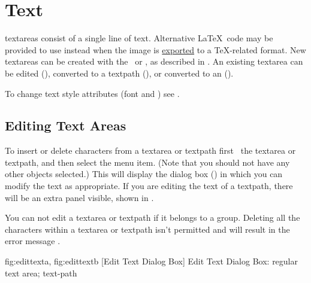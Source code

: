 
\chapter{Text}\label{sec:textareas}

\Glspl{textarea} consist of a single line of text. Alternative
\LaTeX\ code may be provided to use instead when the image
is \hyperref[sec:exportimage]{exported} to a \TeX-related format.
New \glspl{textarea} can be created with the
\texttool\ or \mathstool, as described in .
An existing \gls{textarea} can be edited (),
converted to a \gls{textpath} (), or
converted to an  ().

To change text style attributes (font and ) see
.

\section{Editing Text Areas}\label{sec:edittext}


To insert or delete characters from a \gls{textarea} or \gls{textpath} first
\select\ the \gls*{textarea} or \gls*{textpath}, and then
select the  menu item.  (Note
that you should not have any other \glspl{object} selected.) This
will display the  dialog box
() in which you can modify the text as
appropriate. If you are editing the text of a \gls{textpath}, there
will be an extra panel visible, shown in
.

\begin{information}
You can not edit a \gls*{textarea} or \gls*{textpath} if
it belongs to a \gls{group}. Deleting all the characters within a
\gls*{textarea} or \gls*{textpath} isn't permitted and will result
in the error message .
\end{information}

{
  {fig:edittexta}{}{},
  {fig:edittextb}{}{}
}
[Edit Text Dialog Box]
{Edit Text Dialog Box:  regular text area;
 text-path}

